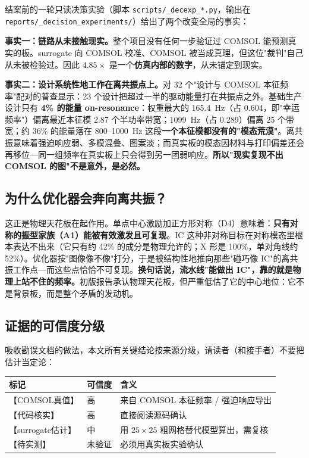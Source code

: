 \documentclass[11pt,a4paper]{article}
\newcommand{\code}[1]{\texttt{#1}}
\begin{document}
结案前的一轮只读决策实验（脚本 \code{scripts/\_decexp\_*.py}，输出在 \code{reports/\_decision\_experiments/}）给出了两个改变全局的事实：

\textbf{事实一：链路从未接触现实。}整个项目没有任何一步验证过 COMSOL 能预测真实的板。surrogate 向 COMSOL 校准、COMSOL 被当成真理，但这位"裁判"自己从未被检验过。因此 $4.85\times$ 是一个\textbf{仿真内部的数字}，从未锚定到现实。

\textbf{事实二：设计系统性地工作在离共振点上。}对 32 个"设计与 COMSOL 本征频率"配对的普查显示：23 个设计把超过一半的驱动能量打在共振点之外。基础生产设计只有 \textbf{4\% 的能量 on-resonance}：权重最大的 165.4~Hz（占 0.604，即"幸运频率"）偏离最近本征模 2.87 个半功率带宽；1099~Hz（占 0.289）偏离 25 个带宽；约 36\% 的能量落在 800--1000~Hz 这段\textbf{一个本征模都没有的"模态荒漠"}。离共振意味着强迫响应弱、多模混叠、图案淡；而真实板的模态因材料与打印偏差还会再移位---同一组频率在真实板上只会得到另一团弱响应。\textbf{所以"现实复现不出 COMSOL 的图"不是意外，是必然。}

\subsection{为什么优化器会奔向离共振？}

这正是物理天花板在起作用。单点中心激励加正方形对称（D4）意味着：\textbf{只有对称的振型家族（A1）能被有效激发且可复现}。IC 这种非对称目标在对称模态里根本表达不出来（它只有约 42\% 的成分是物理允许的；X 形是 100\%，单对角线约 52\%）。优化器按"图像像不像"打分，于是被结构性地推向那些"碰巧像 IC"的离共振工作点---而这些点恰恰不可复现。\textbf{换句话说，流水线"能做出 IC"，靠的就是物理上站不住的频率。}初版报告承认物理天花板，但严重低估了它的中心地位：它不是背景板，而是整个矛盾的发动机。

\subsection{证据的可信度分级}

吸收勘误文档的做法，本文所有关键结论按来源分级，请读者（和接手者）不要把估计当定论：

\begin{center}
\small
\begin{tabular}{@{}llp{}@{}}
\toprule
标记 & 可信度 & 含义 \\
\midrule
【COMSOL真值】 & 高 & 来自 COMSOL 本征频率 / 强迫响应导出 \\
【代码核实】 & 高 & 直接阅读源码确认 \\
【surrogate估计】 & 中 & 用 $25\times 25$ 粗网格替代模型算出，需复核 \\
【待实测】 & 未验证 & 必须用真实板实验确认 \\
\bottomrule
\end{tabular}
\end{center}
\end{document}
